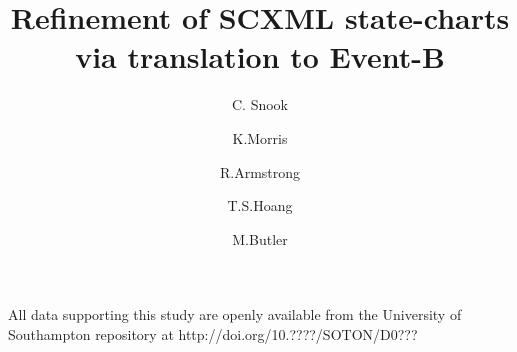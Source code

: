 \documentclass[runningheads,a4paper]{llncs}
\begin{document}
\mainmatter  %

\title{Refinement of SCXML state-charts via translation to Event-B}


%
\author{C. Snook  %
\and K.Morris     
\and R.Armstrong 
\and T.S.Hoang   
\and M.Butler     
}




\maketitle

\resetabbrev


















\begin{footnotesize} %
\vspace{10 pt}
\par
\noindent
All data supporting this study are openly available from the University of Southampton repository at
http://doi.org/10.????/SOTON/D0???\\   %
\end{footnotesize} %




\end{document}
